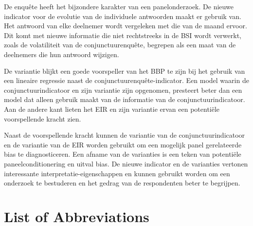 \documentclass[12pt,a4paper,oneside]{book}
\begin{document}
De enquête heeft het bijzondere karakter van een panelonderzoek. De nieuwe indicator voor de evolutie van de individuele antwoorden maakt er gebruik van. Het antwoord van elke deelnemer wordt vergeleken met die van de maand ervoor. Dit komt met nieuwe informatie die niet rechtstreeks in de BSI wordt verwerkt, zoals de volatiliteit van de conjunctuurenquête, begrepen als een maat van de deelnemers die hun antwoord wijzigen.

De variantie blijkt een goede voorspeller van het BBP te zijn bij het gebruik van een lineaire regressie naast de conjunctuurenquête-indicator. Een model waarin de conjunctuurindicatoor en zijn variantie zijn opgenomen, presteert beter dan een model dat alleen gebruik maakt van de informatie van de conjunctuurindicatoor. Aan de andere kant lieten het EIR en zijn variantie ervan een potentiële voorspellende kracht zien.

Naast de voorspellende kracht kunnen de variantie van de conjunctuurindicatoor en de variantie van de EIR worden gebruikt om een mogelijk panel gerelateerde bias te diagnosticeren. Een afname van de varianties is een teken van potentiële paneelconditionering en uitval bias. De nieuwe indicator en de varianties vertonen interessante interpretatie-eigenschappen en kunnen gebruikt worden om een onderzoek te bestuderen en het gedrag van de respondenten beter te begrijpen.






\chapter*{List of Abbreviations}
\end{document}
